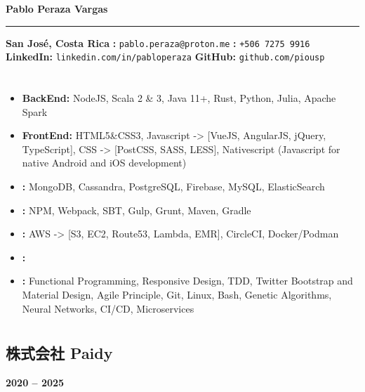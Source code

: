 \documentclass[a4paper,10pt]{article}
\begin{document}
\begin{center}
    {\Huge \textbf{Pablo Peraza Vargas}}
    \par\noindent\rule{\textwidth}{1pt}
    \vspace{5pt}
    \textbf{San José, Costa Rica} \quad
    \textbf{\correo:} \texttt{pablo.peraza@proton.me} \quad
    \textbf{\tel:} \texttt{+506 7275 9916} \\
    \textbf{LinkedIn:} \texttt{linkedin.com/in/pabloperaza} \quad
    \textbf{GitHub:} \texttt{github.com/piousp}
\end{center}

\section*{\resumen}
\resumenTexto

\subsection*{\techSkills}
\begin{itemize}
    \item \textbf{BackEnd:} NodeJS, Scala 2 \& 3, Java 11+, Rust, Python, Julia, Apache Spark
    \item \textbf{FrontEnd:} HTML5\&CSS3, Javascript -> [VueJS, AngularJS, jQuery, TypeScript],
     CSS -> [PostCSS, SASS, LESS], Nativescript (Javascript for native Android and iOS development)
    \item \textbf{\databases:} MongoDB, Cassandra, PostgreSQL, Firebase, MySQL, ElasticSearch
    \item \textbf{\buildtools:} NPM, Webpack, SBT, Gulp, Grunt, Maven, Gradle
    \item \textbf{\env:} AWS -> [S3, EC2, Route53, Lambda, EMR], CircleCI, Docker/Podman
    \item \textbf{\lenguage:} \lengText
    \item \textbf{\other:} Functional Programming, Responsive Design, TDD, 
    Twitter Bootstrap and Material Design, Agile Principle, Git, 
    Linux, Bash, Genetic Algorithms, Neural Networks, CI/CD, Microservices
\end{itemize}

\section*{\exp}
\subsection*{株式会社 Paidy}
\textbf{2020 -- 2025} \hfill  \japan \\
\emph{\softDevSeniorScala}
\paidyText
\end{document}
